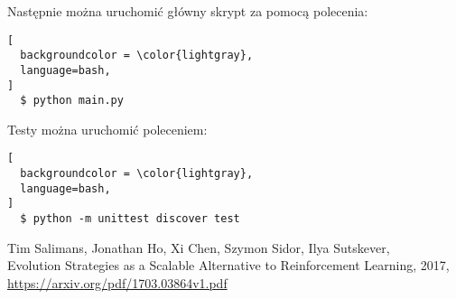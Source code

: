 \documentclass[12pt,a4paper]{article}
\begin{document}
\bigskip

Następnie można uruchomić główny skrypt za pomocą polecenia:

\begin{lstlisting}[
  backgroundcolor = \color{lightgray},
  language=bash,
]
  $ python main.py
\end{lstlisting}

Testy można uruchomić poleceniem:

\begin{lstlisting}[
  backgroundcolor = \color{lightgray},
  language=bash,
]
  $ python -m unittest discover test
\end{lstlisting}

\pagebreak
\begin{thebibliography}{9}
  Tim Salimans, Jonathan Ho, Xi Chen, Szymon Sidor, Ilya Sutskever,\\
  Evolution Strategies as a Scalable Alternative to Reinforcement Learning,
  2017, \href{https://arxiv.org/pdf/1703.03864v1.pdf}{https://arxiv.org/pdf/1703.03864v1.pdf}

\end{thebibliography}
\end{document}
